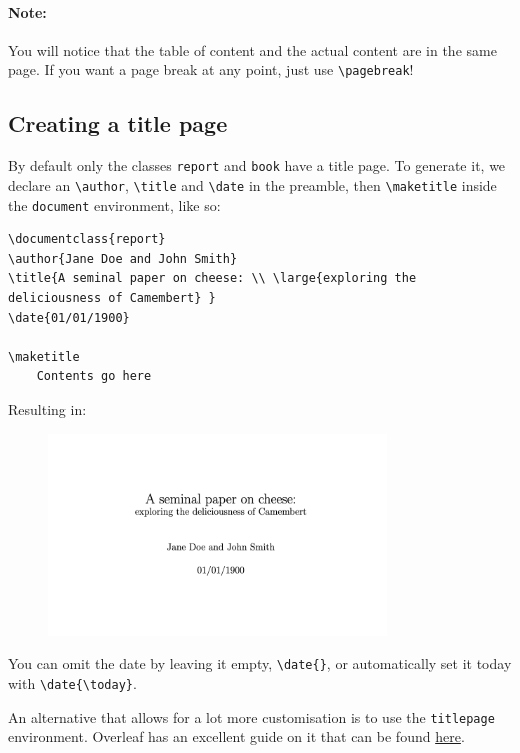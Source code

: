 \paragraph{Note:} You will notice that the table of content and the actual content are in the same page. If you want a page break at any point, just use \verb|\pagebreak|!

\subsection{Creating a title page}
By default only the classes \texttt{report} and \texttt{book} have a title page. To generate it, we declare an \verb|\author|, \verb|\title| and \verb|\date| in the preamble, then \verb|\maketitle| inside the \texttt{document} environment, like so:
\begin{lstlisting}
\documentclass{report}
\author{Jane Doe and John Smith}
\title{A seminal paper on cheese: \\ \large{exploring the deliciousness of Camembert} }
\date{01/01/1900}

\maketitle
    Contents go here

\end{lstlisting}

Resulting in:
\begin{figure}[h]
\centering
    \includegraphics[width=0.8\textwidth]{figures/title.png}
\label{fig:title}
\end{figure}

You can omit the date by leaving it empty, \verb|\date{}|, or automatically set it today with \verb|\date{\today}|.

An alternative that allows for a lot more customisation is to use the \texttt{titlepage} environment.
Overleaf has an excellent guide on it that can be found \href{https://www.overleaf.com/learn/latex/How_to_Write_a_Thesis_in_LaTeX_(Part_5):_Customising_Your_Title_Page_and_Abstract}{here}.